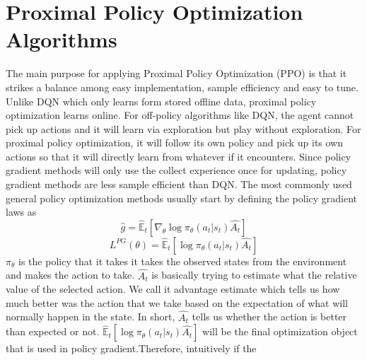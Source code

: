 \documentclass[journal,onecolumn]{IEEEtran}
\begin{document}
\section{ Proximal Policy Optimization Algorithms}
The main purpose for applying Proximal Policy Optimization (PPO) is that it strikes a balance among easy implementation, sample efficiency and easy to tune. Unlike DQN which only learns form stored offline data, proximal policy optimization learns online. For off-policy algorithms like DQN, the agent cannot pick up actions and it will learn via exploration but play without exploration. For proximal policy optimization, it will follow its own policy and pick up its own actions so that it will directly learn from whatever if it encounters. Since policy gradient methods will only use the collect experience once for updating, policy gradient methods are less sample efficient than DQN. The most commonly used general policy optimization methods usually start by defining the policy gradient laws as $$\hat{g} = \hat{\mathbb{E}}_{t}[\nabla_{\theta}\log\pi_{\theta}(a_{t}|s_{t})\hat{A_t}] $$ 
$$L^{PG}(\theta) = \hat{\mathbb{E}}_{t}[\log\pi_{\theta}(a_{t}|s_{t})\hat{A_t}] $$ $\pi_{\theta}$ is the policy that it takes it takes the observed states from the environment and makes the action to take. $\hat{A_t}$ is basically trying to estimate what the relative value of the selected action. We call it advantage estimate which tells us how much better was the action that we take based on the expectation of what will normally happen in the state. In short, $\hat{A_t}$ tells us whether the action is better than expected or not. $\hat{\mathbb{E}}_{t}[\log\pi_{\theta}(a_{t}|s_{t})\hat{A_t}]$ will be the final optimization object that is used in policy gradient.Therefore, intuitively if the 
\end{document}
